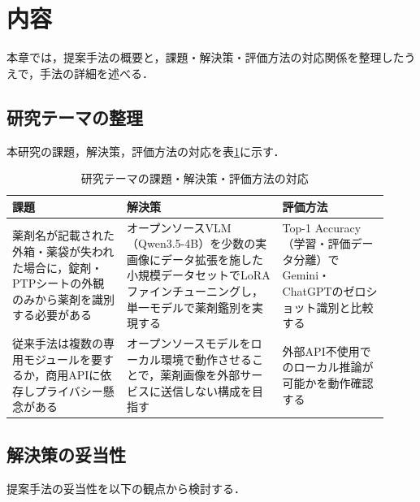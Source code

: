 \documentclass{jsarticle}
\begin{document}
\newpage

\section{内容}\label{sec3}

本章では，提案手法の概要と，課題・解決策・評価方法の対応関係を整理したうえで，手法の詳細を述べる．

\subsection{研究テーマの整理}

本研究の課題，解決策，評価方法の対応を表\ref{tab:theme}に示す．

\begin{table}[h]
\centering
\caption{研究テーマの課題・解決策・評価方法の対応}
\label{tab:theme}
\small
\setlength{\tabcolsep}{4pt}
\begin{tabular}{p{0.28\linewidth}p{0.38\linewidth}p{0.26\linewidth}}
\hline
課題 & 解決策 & 評価方法 \\
\hline
薬剤名が記載された外箱・薬袋が失われた場合に，錠剤・PTPシートの外観のみから薬剤を識別する必要がある &
オープンソースVLM（Qwen3.5-4B）を少数の実画像にデータ拡張を施した小規模データセットでLoRAファインチューニングし，単一モデルで薬剤鑑別を実現する &
Top-1 Accuracy（学習・評価データ分離）でGemini・ChatGPTのゼロショット識別と比較する \\
\hline
従来手法は複数の専用モジュールを要するか，商用APIに依存しプライバシー懸念がある &
オープンソースモデルをローカル環境で動作させることで，薬剤画像を外部サービスに送信しない構成を目指す &
外部API不使用でのローカル推論が可能かを動作確認する \\
\hline
\end{tabular}
\end{table}

\subsection{解決策の妥当性}

提案手法の妥当性を以下の観点から検討する．
\end{document}
